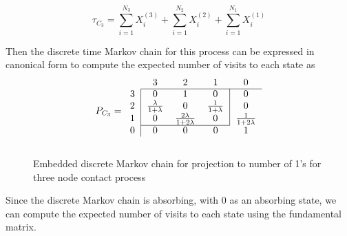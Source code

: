 \begin{equation}
    \tau_{C_3} = \sum_{i = 1}^{N_3} X_i^{(3)} + \sum_{i = 1}^{N_2} X_i^{(2)} + \sum_{i = 1}^{N_1} X_i^{(1)}
\end{equation}

Then the discrete time Markov chain for this process can be expressed in canonical form to compute the expected number of visits to each state as
$$
P_{C_3} = \begin{blockarray}{ccccc}
    & 3 & 2 & 1 & 0\\
    \begin{block}{c|ccc|c}
    \cline{2-5}
        3 & 0 & 1 & 0 & 0 \\
        2 & \frac{\lambda}{1 + \lambda} & 0 &
        \frac{1}{1 + \lambda} & 0\\
        1 & 0 & \frac{2\lambda}{1 + 2 \lambda} & 0 & \frac{1}{1 + 2\lambda}\\
    \cline{2-4}
    \end{block}
    \begin{block}{c|cccc}
    0 & 0 & 0 & 0 & 1\\
    \end{block}
\end{blockarray}
$$

\begin{figure}[H]
    \centering
    \caption{Embedded discrete Markov chain for projection to number of 1's for three node contact process}
    \label{fig:discrete_mc_three_contact}
\end{figure}

Since the discrete Markov chain is absorbing, with 0 as an absorbing state, we can compute the expected number of visits to each state using the fundamental matrix.

